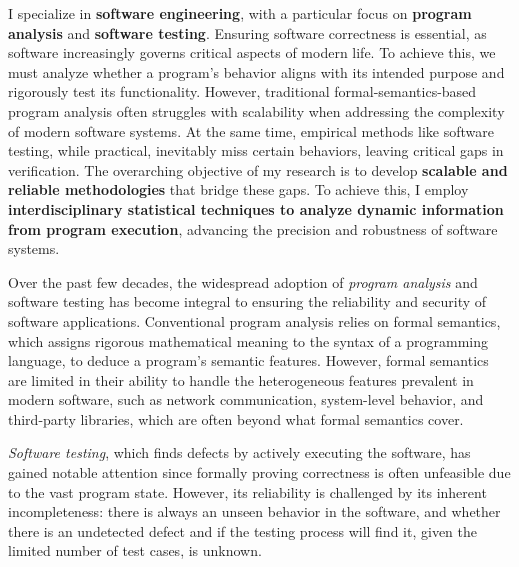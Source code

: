\documentclass{article}
\begin{document}
\thispagestyle{firstpage} %


\noindent 
I specialize in \textbf{software engineering}, with a particular focus on \textbf{program analysis} and \textbf{software testing}. Ensuring software correctness is essential, as software increasingly governs critical aspects of modern life. To achieve this, we must analyze whether a program's behavior aligns with its intended purpose and rigorously test its functionality. However, traditional formal-semantics-based program analysis often struggles with scalability when addressing the complexity of modern software systems. At the same time, empirical methods like software testing, while practical, inevitably miss certain behaviors, leaving critical gaps in verification. The overarching objective of my research is to develop \textbf{\color{blue}scalable and reliable methodologies} that bridge these gaps. To achieve this, I employ \textbf{\color{blue}interdisciplinary statistical techniques to analyze dynamic information from program execution}, advancing the precision and robustness of software systems.

Over the past few decades, the widespread adoption of \emph{program analysis} and software testing has become integral to ensuring the reliability and security of software applications. Conventional program analysis relies on formal semantics, which assigns rigorous mathematical meaning to the syntax of a programming language, to deduce a program's semantic features. However, formal semantics are limited in their ability to handle the heterogeneous features prevalent in modern software, such as network communication, system-level behavior, and third-party libraries, which are often beyond what formal semantics cover.

\emph{Software testing}, which finds defects by actively executing the software, has gained notable attention since formally proving correctness is often unfeasible due to the vast program state. However, its reliability is challenged by its inherent incompleteness: there is always an unseen behavior in the software, and whether there is an undetected defect and if the testing process will find it, given the limited number of test cases, is unknown.
\end{document}
